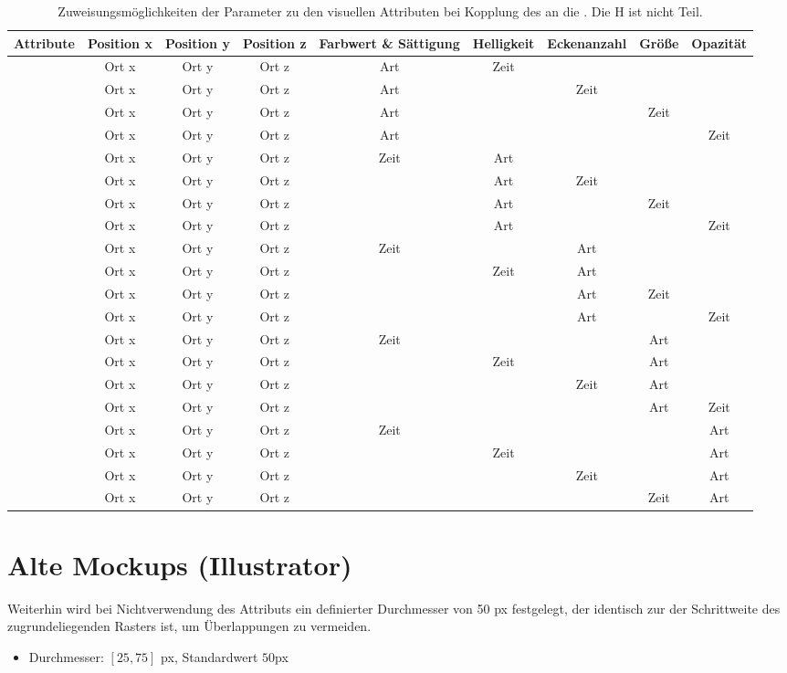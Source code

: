 \begin{table} 
	\begin{tabularx}{\textwidth}{@{}CCCCCCCCC@{}}
		\toprule
		Attribute & Position x & Position y & Position z & Farbwert \& Sättigung & Helligkeit & Eckenanzahl & Größe & Opazität \tabularnewline
		\midrule
		& Ort x & Ort y & Ort z & Art & Zeit \tabularnewline
		& Ort x & Ort y & Ort z & Art & & Zeit \tabularnewline 
		& Ort x & Ort y & Ort z & Art & & & Zeit \tabularnewline 
		& Ort x & Ort y & Ort z & Art & & & & Zeit \tabularnewline 
		\midrule
		& Ort x & Ort y & Ort z & Zeit & Art \tabularnewline 
		& Ort x & Ort y & Ort z & & Art & Zeit \tabularnewline
		& Ort x & Ort y & Ort z & & Art & & Zeit \tabularnewline 
		& Ort x & Ort y & Ort z & & Art & & & Zeit \tabularnewline
		\midrule
		& Ort x & Ort y & Ort z & Zeit & & Art \tabularnewline 
		& Ort x & Ort y & Ort z & & Zeit & Art \tabularnewline 
		& Ort x & Ort y & Ort z & & & Art & Zeit \tabularnewline
		& Ort x & Ort y & Ort z & & & Art & & Zeit \tabularnewline 
		\midrule
		& Ort x & Ort y & Ort z & Zeit & & & Art \tabularnewline 
		& Ort x & Ort y & Ort z & & Zeit & & Art \tabularnewline 
		& Ort x & Ort y & Ort z & & & Zeit & Art \tabularnewline 
		& Ort x & Ort y & Ort z & & & & Art & Zeit \tabularnewline
		\midrule
		& Ort x & Ort y & Ort z & Zeit & & & & Art \tabularnewline 
		& Ort x & Ort y & Ort z & & Zeit & & & Art \tabularnewline 
		& Ort x & Ort y & Ort z & & & Zeit & & Art \tabularnewline 
		& Ort x & Ort y & Ort z & & & & Zeit & Art \tabularnewline
		\bottomrule
	\end{tabularx}
	\caption{Zuweisungsmöglichkeiten der Parameter zu den visuellen Attributen bei Kopplung des  an die . Die  H ist nicht Teil.}\label{tab:entwurf:zuweisung-param-attr:feste-position}
\end{table}


\section{Alte Mockups (Illustrator)}

Weiterhin wird bei Nichtverwendung des Attributs  ein definierter Durchmesser von 50 \gls{px} festgelegt, der identisch zur der Schrittweite des zugrundeliegenden Rasters ist, um Überlappungen zu vermeiden.

\begin{itemize}
	\item Durchmesser: $[25,75]$ \gls{px}, Standardwert $50$\gls{px}
\end{itemize}

